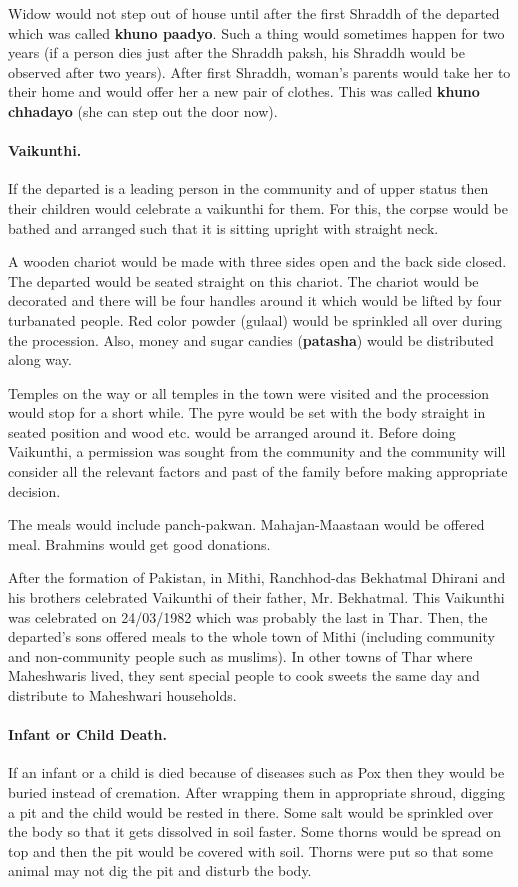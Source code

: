 Widow would not step out of house until after the first Shraddh of the
departed which was called \textbf{khuno paadyo}. Such a thing would sometimes
happen for two years (if a person dies just after the Shraddh paksh, his
Shraddh would be observed after two years). After first Shraddh, woman's
parents would take her to their home and would offer her a new pair of clothes.
This was called \textbf{khuno chhadayo} (she can step out the door now). 

\paragraph{Vaikunthi.} If the departed is a leading person in the community and
of upper status then their children would celebrate a vaikunthi for them. For
this, the corpse would be bathed and arranged such that it is sitting upright
with straight neck. 

A wooden chariot would be made with three sides open and the back side closed.
The departed would be seated straight on this chariot. The chariot would be
decorated and there will be four handles around it which would be lifted by
four turbanated people. Red color powder (gulaal) would be sprinkled all over
during the procession. Also, money and sugar candies (\textbf{patasha}) would
be distributed along way.

Temples on the way or all temples in the town were visited and the procession
would stop for a short while. The pyre would be set with the body straight in
seated position and wood etc. would be arranged around it. Before doing
Vaikunthi, a permission was sought from the community and the community will
consider all the relevant factors and past of the family before making
appropriate decision.

The meals would include panch-pakwan. Mahajan-Maastaan would be offered meal.
Brahmins would get good donations.

After the formation of Pakistan, in Mithi, Ranchhod-das Bekhatmal Dhirani and
his brothers celebrated Vaikunthi of their father, Mr. Bekhatmal. This
Vaikunthi was celebrated on 24/03/1982 which was probably the last in Thar.
Then, the departed's sons offered meals to the whole town of Mithi (including
community and non-community people such as muslims). In other towns of Thar
where Maheshwaris lived, they sent special people to cook sweets the same day
and distribute to Maheshwari households.

\paragraph{Infant or Child Death.} If an infant or a child is died because of
diseases such as Pox then they would be buried instead of cremation. After
wrapping them in appropriate shroud, digging a pit and the child would be
rested in there. Some salt would be sprinkled over the body so that it gets
dissolved in soil faster. Some thorns would be spread on top and then the pit
would be covered with soil. Thorns were put so that some animal may not dig the
pit and disturb the body.

